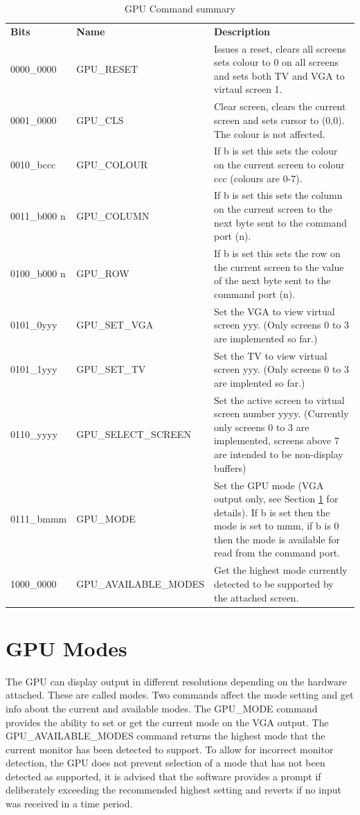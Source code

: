 \documentclass[a4paper,10pt]{book}
\begin{document}
\begin{table}
 \begin{tabular}{llp{7cm}}
  \textbf{Bits}&\textbf{Name}&\textbf{Description}\\
  0000\_0000&GPU\_RESET&Issues a reset, clears all screens sets colour to 0 on all
  screens and sets both TV and VGA to virtaul screen 1.\\
  0001\_0000&GPU\_CLS&Clear screen, clears the current screen and sets cursor to
  (0,0).  The colour is not affected.\\
  0010\_bccc&GPU\_COLOUR&If b is set this sets the colour on the current screen
  to colour ccc (colours are 0-7).\\
  0011\_b000 n&GPU\_COLUMN&If b is set this sets the column on the current screen
  to the next byte sent to the command port (n).\\
  0100\_b000 n&GPU\_ROW&If b is set this sets the row on the current screen to the
  value of the next byte sent to the command port (n).\\
  0101\_0yyy&GPU\_SET\_VGA&Set the VGA to view virtual screen yyy.  (Only screens
  0 to 3 are implemented so far.)\\
  0101\_1yyy&GPU\_SET\_TV&Set the TV to view virtual screen yyy.  (Only screens 0
  to 3 are implented so far.)\\
  0110\_yyyy&GPU\_SELECT\_SCREEN&Set the active screen to virtual screen number
  yyyy.  (Currently only screens 0 to 3 are implemented, screens above 7 are
  intended to be non-display buffers)\\
  0111\_bmmm&GPU\_MODE&Set the GPU mode (VGA output only, see Section 
  \ref{sec:gpumodes} for details).  If b is set then the mode is set to mmm, if 
  b is 0 then the mode is available for read from the command port.\\
  1000\_0000&GPU\_AVAILABLE\_MODES&Get the highest mode currently detected to be
  supported by the attached screen.\\
 \end{tabular}
 \caption{GPU Command summary}
 \label{tab:gpucommands}
\end{table}

\section{GPU Modes}
\label{sec:gpumodes}
The GPU can display output in different resolutions depending on the hardware
attached.  These are called modes.  Two commands affect the mode setting and get
info about the current and available modes.  The GPU\_MODE command provides the
ability to set or get the current mode on the VGA output.  The
GPU\_AVAILABLE\_MODES command returns the highest mode that the current monitor
has been detected to support.  To allow for incorrect monitor detection, the GPU
does not prevent selection of a mode that has not been detected as supported, it
is advised that the software provides a prompt if deliberately exceeding the
recommended highest setting and reverts if no input was received in a time
period.
\end{document}
